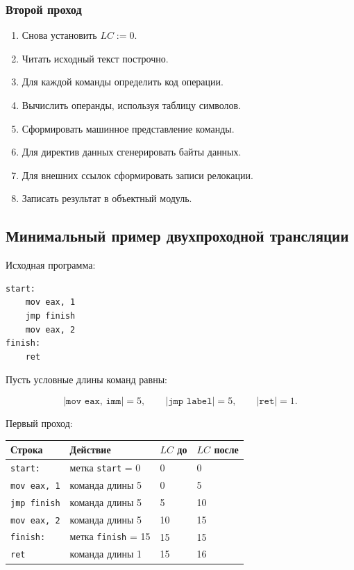 \documentclass[12pt,a4paper]{article}
\begin{document}
\subsubsection*{Второй проход}

\begin{enumerate}
    \item Снова установить $LC := 0$.
    \item Читать исходный текст построчно.
    \item Для каждой команды определить код операции.
    \item Вычислить операнды, используя таблицу символов.
    \item Сформировать машинное представление команды.
    \item Для директив данных сгенерировать байты данных.
    \item Для внешних ссылок сформировать записи релокации.
    \item Записать результат в объектный модуль.
\end{enumerate}

\subsection{Минимальный пример двухпроходной трансляции}

Исходная программа:

\begin{lstlisting}
start:
    mov eax, 1
    jmp finish
    mov eax, 2
finish:
    ret
\end{lstlisting}

Пусть условные длины команд равны:

\[
|\texttt{mov eax, imm}| = 5,
\qquad
|\texttt{jmp label}| = 5,
\qquad
|\texttt{ret}| = 1.
\]

Первый проход:

\begin{center}
\begin{tabular}{llll}
\toprule
Строка & Действие & $LC$ до & $LC$ после \\
\midrule
\texttt{start:} & метка \texttt{start} = 0 & 0 & 0 \\
\texttt{mov eax, 1} & команда длины 5 & 0 & 5 \\
\texttt{jmp finish} & команда длины 5 & 5 & 10 \\
\texttt{mov eax, 2} & команда длины 5 & 10 & 15 \\
\texttt{finish:} & метка \texttt{finish} = 15 & 15 & 15 \\
\texttt{ret} & команда длины 1 & 15 & 16 \\
\bottomrule
\end{tabular}
\end{center}
\end{document}
